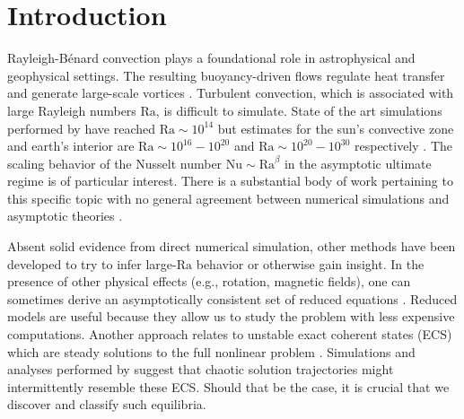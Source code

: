 \documentclass[reprint,amsmath,amssymb,aps,nofootinbib]{revtex4-1}
\newcommand\Ra{\mathrm{Ra}}
\newcommand\Nu{\mathrm{Nu}}
\begin{document}
\section{Introduction}
Rayleigh-B\'enard convection plays a foundational role in astrophysical and geophysical settings.
The resulting buoyancy-driven flows regulate heat transfer and generate large-scale vortices \cite{Couston}.
Turbulent convection, which is associated with large Rayleigh numbers $\Ra$, is difficult to simulate. 
State of the art simulations performed by \cite{Zhu_2018} have reached $\Ra \sim 10^{14}$ but estimates for the sun's convective zone and earth's interior are $\Ra \sim 10^{16}-10^{20}$ and $\Ra \sim 10^{20}-10^{30}$ respectively \cite{Ossendrijver,Gubbins_2001}. 
The scaling behavior of the Nusselt number $\Nu \sim \Ra^{\beta}$ in the asymptotic ultimate regime is of particular interest.
There is a substantial body of work pertaining to this specific topic with no general agreement between numerical simulations and asymptotic theories \cite{Malkus_1954, Howard_1966, Kraichnan, Spiegel, Castaing, Grossman, Ahlers}. 

Absent solid evidence from direct numerical simulation, other methods have been developed to try to infer large-$\Ra$ behavior or otherwise gain insight.
In the presence of other physical effects (e.g., rotation, magnetic fields), one can sometimes derive an asymptotically consistent set of reduced equations \cite{Julien2007, Julien2012}.
Reduced models are useful because they allow us to study the problem with less expensive computations.
Another approach relates to unstable exact coherent states (ECS) which are steady solutions to the full nonlinear problem \cite{Waleffe, Sondak, Wen, chini_cells}. 
Simulations and analyses performed by \cite{Yalniz, Cvitanovic} suggest that chaotic solution trajectories might intermittently resemble these ECS.
Should that be the case, it is crucial that we discover and classify such equilibria. 
\end{document}
